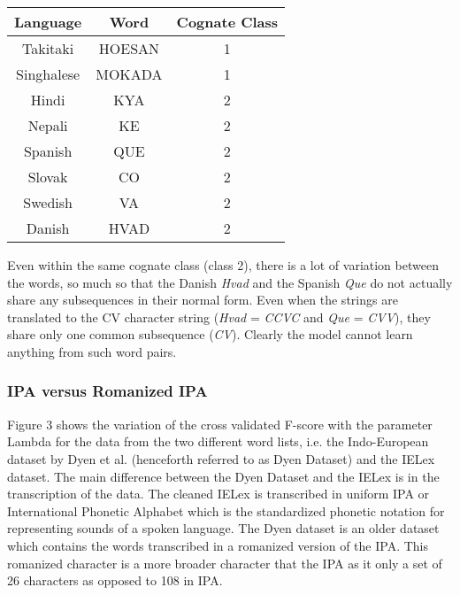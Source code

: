 \documentclass[journal]{IEEEtran}
\begin{document}
\begin{table}[h!]
\centering
\label{my-label}
\begin{tabular}{|c|c|c|}
\hline
\textbf{Language} & \textbf{Word} & \textbf{Cognate Class} \\ \hline
Takitaki          & HOESAN        & 1                      \\ \hline
Singhalese        & MOKADA        & 1                      \\ \hline
Hindi             & KYA           & 2                      \\ \hline
Nepali            & KE            & 2                      \\ \hline
Spanish           & QUE           & 2                      \\ \hline
Slovak            & CO            & 2                      \\ \hline
Swedish           & VA            & 2                      \\ \hline
Danish            & HVAD          & 2                      \\ \hline
\end{tabular}
\end{table}

Even within the same cognate class (class 2), there is a lot of variation between the words, so much so that the Danish \textit{Hvad} and the Spanish \textit{Que} do not actually share any subsequences in their normal form. Even when the strings are translated to the CV character string (\textit{Hvad} = \textit{CCVC} and \textit{Que} = \textit{CVV}), they share only one common subsequence (\textit{CV}). Clearly the model cannot learn anything from such word pairs.

\subsubsection{IPA versus Romanized IPA}

Figure 3 shows the variation of the cross validated F-score with the parameter Lambda for the data from the two different word lists, i.e. the Indo-European dataset by Dyen et al. (henceforth referred to as Dyen Dataset) and the IELex dataset. The main difference between the Dyen Dataset and the IELex is in the transcription of the data. The cleaned IELex is transcribed in uniform IPA or International Phonetic Alphabet which is the standardized phonetic notation for representing sounds of a spoken language. The Dyen dataset is an older dataset which contains the words transcribed in a romanized version of the IPA. This romanized character is a more broader character that the IPA as it only a set of 26 characters as opposed to 108 in IPA.
\end{document}

